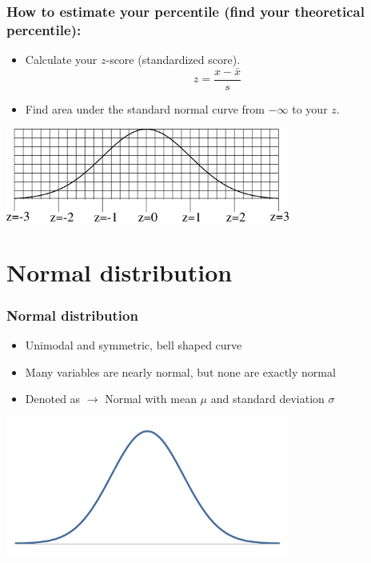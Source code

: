\begin{frame}
\frametitle{How to estimate your percentile (find your theoretical percentile):}
\begin{itemize}
\item Calculate your $z$-score (standardized score).
 $$z = \frac{x-\bar{x}}{s} $$
\item Find area under the standard normal curve from $-\infty$ to your $z$.
\end{itemize}
\begin{center}
\includegraphics[width=0.7\textwidth]{3-1_normal_distribution/figures/grades/standard_normal.png}
\end{center}
\end{frame}


\section{Normal distribution}


\begin{frame}
\frametitle{Normal distribution}

\begin{itemize}

\item Unimodal and symmetric, bell shaped curve

\item Many variables are nearly normal, but none are exactly normal

\item Denoted as  $\rightarrow$ Normal with mean $\mu$ and standard deviation $\sigma$

\end{itemize}

\begin{center}
\includegraphics[width=0.7\textwidth]{3-1_normal_distribution/figures/simpleNormal/simpleNormal}
\end{center}

\end{frame}

